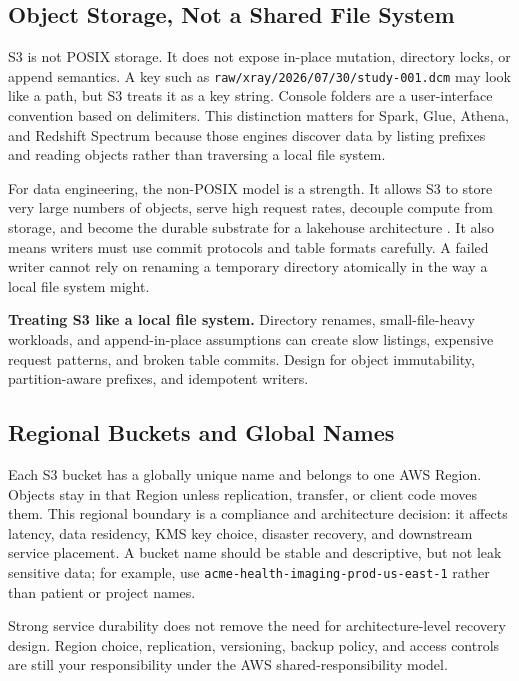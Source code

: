 \subsection{Object Storage, Not a Shared File System}
S3 is not POSIX storage. It does not expose in-place mutation, directory locks, or append semantics. A key such as \texttt{raw/xray/2026/07/30/study-001.dcm} may look like a path, but S3 treats it as a key string. Console folders are a user-interface convention based on delimiters. This distinction matters for Spark, Glue, Athena, and Redshift Spectrum because those engines discover data by listing prefixes and reading objects rather than traversing a local file system.

For data engineering, the non-POSIX model is a strength. It allows S3 to store very large numbers of objects, serve high request rates, decouple compute from storage, and become the durable substrate for a lakehouse architecture \cite{armbrust2021lakehouse}. It also means writers must use commit protocols and table formats carefully. A failed writer cannot rely on renaming a temporary directory atomically in the way a local file system might.

\begin{pitfall}
\textbf{Treating S3 like a local file system.} Directory renames, small-file-heavy workloads, and append-in-place assumptions can create slow listings, expensive request patterns, and broken table commits. Design for object immutability, partition-aware prefixes, and idempotent writers.
\end{pitfall}

\subsection{Regional Buckets and Global Names}
Each S3 bucket has a globally unique name and belongs to one AWS Region. Objects stay in that Region unless replication, transfer, or client code moves them. This regional boundary is a compliance and architecture decision: it affects latency, data residency, KMS key choice, disaster recovery, and downstream service placement. A bucket name should be stable and descriptive, but not leak sensitive data; for example, use \texttt{acme-health-imaging-prod-us-east-1} rather than patient or project names.

\begin{notebox}
Strong service durability does not remove the need for architecture-level recovery design. Region choice, replication, versioning, backup policy, and access controls are still your responsibility under the AWS shared-responsibility model.
\end{notebox}

